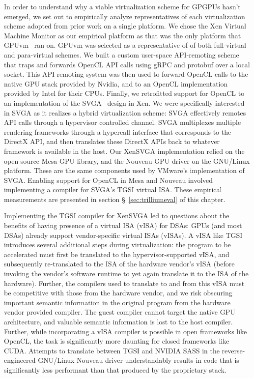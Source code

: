 In order to understand why a viable virtualization scheme for GPGPUs hasn't
emerged, we set out to empirically analyze representatives of each
virtualization scheme adopted from prior work on a single platform. We chose
the Xen Virtual Machine Monitor as our empirical platform as that was the only
platform that GPUvm~\cite{suzuki2014gpuvm} ran on. GPUvm was selected as a
representative of of both full-virtual and para-virtual schemes. We built a
custom user-space API-remoting scheme that traps and forwards OpenCL API calls
using gRPC and protobuf over a local socket. This API remoting system was then
used to forward OpenCL calls to the native GPU stack provided by Nvidia, and
to an OpenCL implementation provided by Intel for their CPUs. Finally, we
retrofitted support for OpenCL to an implementation of the SVGA~\cite{
dowty2009gpu} design in Xen. We were specifically interested in SVGA as it
realizes a hybrid virtualization scheme: SVGA effectively remotes API calls
through a hypervisor controlled channel. SVGA multiplexes multiple rendering
frameworks through a hypercall interface that corresponds to the DirectX API,
and then translates these DirectX APIs back to whatever framework is available
in the host.
Our XenSVGA implementation relied on the open source Mesa GPU library, and the
Nouveau GPU driver on the GNU/Linux platform. These are the same components
used by VMware's implementation of SVGA. Enabling support for OpenCL in Mesa
and Nouveau involved implementing a compiler for SVGA's TGSI virtual ISA.
These empirical measurements are presented in section \S~\ref{sec:trilliumeval}
of this chapter.

Implementing the TGSI compiler for XenSVGA led to questions about the benefits
of having presence of a virtual ISA (vISA) for DSAs: GPUs (and most DSAs)
already support vendor-specific virtual ISAs (vISAs). A vISA like TGSI
introduces several additional steps during virtualization: the program to be
accelerated must first be translated to the hypervisor-supported vISA, and
subsequently re-translated to the ISA of the hardware vendor's vISA (before
invoking the vendor's software runtime to yet again translate it to the ISA of
the hardware). Further, the compilers used to translate to and from this vISA
must be competitive with those from the hardware vendor, and we risk obscuring
important semantic information in the original program from the hardware
vendor provided compiler. The guest compiler cannot target the native GPU
architecture, and valuable semantic information is lost to the host compiler.
Further, while incorporating a vISA compiler is possible in open frameworks
like OpenCL, the task is significantly more daunting for closed frameworks
like CUDA. Attempts to translate between TGSI and NVIDIA SASS in the
reverse-engineered GNU/Linux Nouveau driver understandably results in code
that is significantly less performant than that produced by the proprietary
stack.

